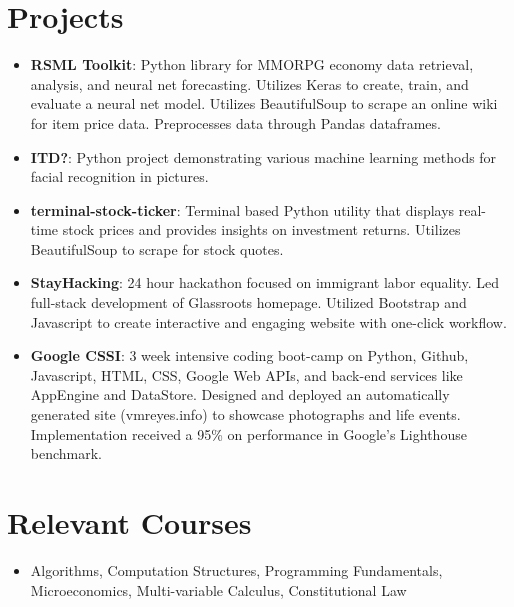 \documentclass[letterpaper,11pt]{article}
\newcommand{\resumeItem}[2]{
  \item\small{
    \textbf{#1}{: #2 \vspace{-2pt}}
  }
}
\newcommand{\resumeSubItem}[2]{\resumeItem{#1}{#2}\vspace{-4pt}}
\newcommand{\resumeSubHeadingListStart}{\begin{itemize}[leftmargin=*]}
\newcommand{\resumeSubHeadingListEnd}{\end{itemize}}
\begin{document}
\section{Projects}
  \resumeSubHeadingListStart
      \resumeSubItem{RSML Toolkit}
      {Python library for MMORPG economy data retrieval, analysis, and neural net forecasting. Utilizes Keras to create, train, and
       evaluate a neural net model. Utilizes BeautifulSoup to scrape an online wiki for item price data.
       Preprocesses data through Pandas dataframes.}
    \resumeSubItem{ITD?}
      {Python project demonstrating various machine learning methods for facial recognition in pictures.}
      \resumeSubItem{terminal-stock-ticker}
  	  {Terminal based Python utility that displays real-time stock prices and provides insights on investment returns. Utilizes BeautifulSoup to
  	   scrape for stock quotes. }
    \resumeSubItem{StayHacking}
      {24 hour hackathon focused on immigrant labor equality. Led full-stack development of Glassroots homepage.
       Utilized Bootstrap and Javascript to create interactive and engaging website with one-click workflow.}
    \resumeSubItem{Google CSSI}
      {3 week intensive coding boot-camp on Python, Github, Javascript, HTML, CSS, Google Web APIs, and back-end services like AppEngine and DataStore. Designed and deployed an automatically generated site (vmreyes.info) to showcase photographs and life events. Implementation received a 95\% on performance in Google's Lighthouse benchmark.}
  	

  \resumeSubHeadingListEnd

%
\section{Relevant Courses}
  \resumeSubHeadingListStart
    \item{
      Algorithms,
      Computation Structures,
      Programming Fundamentals,
      Microeconomics,
      Multi-variable Calculus,
      Constitutional Law
    }
  \resumeSubHeadingListEnd


\end{document}
